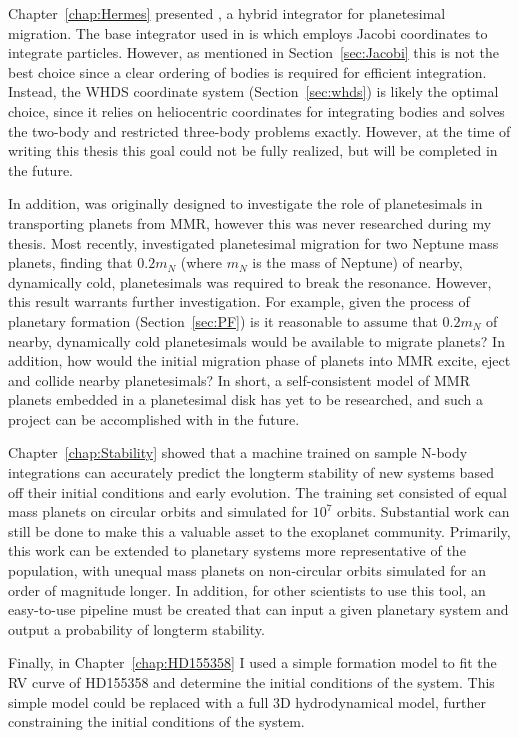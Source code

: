 Chapter~\ref{chap:Hermes} presented \hermes, a hybrid integrator for planetesimal migration. 
The base integrator used in \hermes is \whfast which employs Jacobi coordinates to integrate particles.
However, as mentioned in Section~\ref{sec:Jacobi} this is not the best choice since a clear ordering of bodies is required for efficient integration.
Instead, the WHDS coordinate system (Section~\ref{sec:whds}) is likely the optimal choice, since it relies on heliocentric coordinates for integrating bodies and solves the two-body and restricted three-body problems exactly. 
However, at the time of writing this thesis this goal could not be fully realized, but will be completed in the future.

In addition, \hermes was originally designed to investigate the role of planetesimals in transporting planets from MMR, however this was never researched during my thesis. 
Most recently, \citet{Chatterjee2015} investigated planetesimal migration for two Neptune mass planets, finding that $0.2m_N$ (where $m_N$ is the mass of Neptune) of nearby, dynamically cold, planetesimals was required to break the resonance. 
However, this result warrants further investigation. 
For example, given the process of planetary formation (Section~\ref{sec:PF}) is it reasonable to assume that $0.2m_N$ of nearby, dynamically cold planetesimals would be available to migrate planets?
In addition, how would the initial migration phase of planets into MMR excite, eject and collide nearby planetesimals?
In short, a self-consistent model of MMR planets embedded in a planetesimal disk has yet to be researched, and such a project can be accomplished with \hermes in the future.

Chapter~\ref{chap:Stability} showed that a machine trained on sample N-body integrations can accurately predict the longterm stability of new systems based off their initial conditions and early evolution. 
The training set consisted of equal mass planets on circular orbits and simulated for $10^7$ orbits. 
Substantial work can still be done to make this a valuable asset to the exoplanet community.
Primarily, this work can be extended to planetary systems more representative of the \kep population, with unequal mass planets on non-circular orbits simulated for an order of magnitude longer. 
In addition, for other scientists to use this tool, an easy-to-use pipeline must be created that can input a given planetary system and output a probability of longterm stability. 

Finally, in Chapter~\ref{chap:HD155358} I used a simple formation model to fit the RV curve of HD155358 and determine the initial conditions of the system. 
This simple model could be replaced with a full 3D hydrodynamical model, further constraining the initial conditions of the system. 

